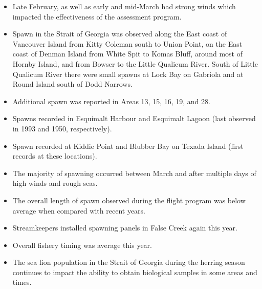 \begin{itemize}

\item Late February, as well as early and mid-March had strong winds
which impacted the effectiveness of the assessment program.

\item Spawn in the Strait of Georgia was observed along
the East coast of Vancouver Island from Kitty Coleman south to Union Point,
on the East coast of Denman Island from White Spit to Komas Bluff,
around most of Hornby Island,
and from Bowser to the Little Qualicum River.
South of Little Qualicum River there were small spawns
at Lock Bay on Gabriola and at Round Island south of Dodd Narrows. 

\item Additional spawn was reported in Areas 13, 15, 16, 19, and 28.

\item Spawns recorded in Esquimalt Harbour and Esquimalt Lagoon
(last observed in 1993 and 1950, respectively).

\item Spawn recorded at Kiddie Point and Blubber Bay
on Texada Island (first records at these locations).

\item The majority of spawning occurred between March  and 
after multiple days of high winds and rough seas.

\item The overall length of spawn observed during the flight program
was below average when compared with recent years.

\item Streamkeepers installed spawning panels in False Creek again this year.

\item Overall fishery timing was average this year.

\item The sea lion population in the Strait of Georgia
during the herring season continues to impact the ability
to obtain biological samples in some areas and times.

\end{itemize}